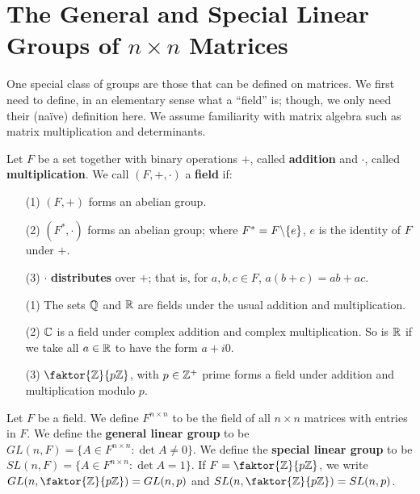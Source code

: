 \section{The General and Special Linear Groups of $n \times n$ Matrices}
\label{section_1.4}

One special class of groups are those that can be defined on matrices. We first
need to define, in an elementary sense what a ``field'' is; though, we
only need their (na\"ive) definition here. We assume familiarity with matrix
algebra such as matrix multiplication and determinants.

\begin{definition}
  Let $F$ be a set together with binary operations  $+$, called
  \textbf{addition} and $\cdot$, called  \textbf{multiplication}. We call
  $(F,+,\cdot)$ a \textbf{field} if:
  \begin{enumerate}
    \item[(1)] $(F,+)$ forms an abelian group.

    \item[(2)] $(F^*,\cdot)$ forms an abelian group; where
      $F^*=F \backslash \{e\}$, $e$ is the identity of  $F$ under  $+$.

    \item[(3)] $\cdot$  \textbf{distributes} over $+$; that is, for  $a,b,c
      \in F$,  $a(b+c)=ab+ac$.
  \end{enumerate}
\end{definition}

\begin{example}\label{example_1.9}
  \begin{enumerate}
    \item[(1)] The sets $\mathbb{Q}$ and  $\mathbb{R}$ are fields under the usual addition
      and multiplication.

    \item[(2)]  $\mathbb{C}$ is a field under complex addition and complex
      multiplication. So is  $\mathbb{R}$ if we take all $a \in \mathbb{R}$ to have the
      form  $a+i0$.

    \item[(3)] $\faktor{\Z}{p\Z}$, with $p \in \mathbb{Z}^+$ prime forms a field
      under addition and multiplication modulo $p$.
  \end{enumerate}
\end{example}

\begin{definition}
  Let $F$ be a field. We define  $F^{n \times n}$ to be the field of all $n
  \times n$ matrices with entries in $F$. We define the \textbf{general linear
  group} to be $GL(n,F)=\{A \in F^{n \times n} : \det{A} \neq 0\}$. We define
  the \textbf{special linear group} to be $SL(n,F)=\{A \in F^{n \times n} :
  \det{A}=1\}$. If $F=\faktor{\Z}{p\Z}$, we write
  $GL(n,\faktor{\Z}{p\Z})=GL(n,p)$ and $SL(n,\faktor{\Z}{p\Z})=SL(n,p)$.
\end{definition}

